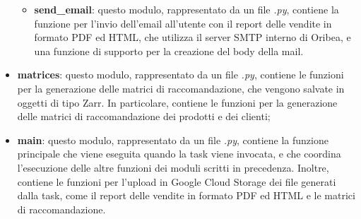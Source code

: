 \begin{itemize}
\begin{itemize}
        \item \textbf{send\_email}: questo modulo, rappresentato da un file \emph{.py}, contiene la funzione per l'invio dell'email all'utente con il report delle vendite in formato PDF ed HTML, che utilizza il server SMTP interno di Oribea, e una funzione di supporto per la creazione del body della mail.
    \end{itemize}
    \item \textbf{matrices}: questo modulo, rappresentato da un file \emph{.py}, contiene le funzioni per la generazione delle matrici di raccomandazione, che vengono salvate in oggetti di tipo Zarr. In particolare, contiene le funzioni per la generazione delle matrici di raccomandazione dei prodotti e dei clienti;
    \item \textbf{main}: questo modulo, rappresentato da un file \emph{.py}, contiene la funzione principale che viene eseguita quando la task viene invocata, e che coordina l'esecuzione delle altre funzioni dei moduli scritti in precedenza. Inoltre, contiene le funzioni per l'upload in Google Cloud Storage dei file generati dalla task, come il report delle vendite in formato PDF ed HTML e le matrici di raccomandazione.
\end{itemize}

